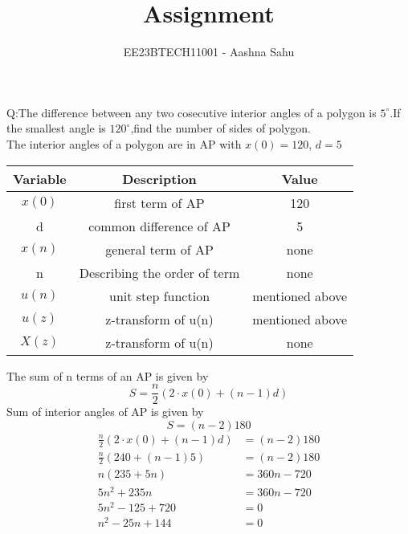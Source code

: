 \documentclass[journal,12pt,twocolumn]{IEEEtran}
\theoremstyle{remark}
\begin{document}
\let\vec\mathbf



\vspace{3cm}
\title{Assignment}
\author{EE23BTECH11001 - Aashna Sahu}
\maketitle
\newpage
\bigskip

\renewcommand{\thefigure}{\theenumi}
\renewcommand{\thetable}{\theenumi}
Q:The difference between any two cosecutive interior angles of a polygon is $5^\circ$.If the smallest angle is $120^\circ$,find the number of sides of polygon.
\\\solution
The interior angles of a polygon are in AP with
    $x(0)=120$, $d=5$
\begin{table}[ht]
  \centering
  \begin{tabular}{|c|c|c|}
    \hline
      \textbf{Variable}& \textbf{Description}& \textbf{Value}\\\hline
    $x(0)$& first term of AP& 120  \\\hline
    d& common difference of AP & 5\\\hline
    $x(n)$ & general  term of AP&none\\\hline
   n & Describing the order of term & none\\\hline
    $u(n)$& unit step function & mentioned above\\\hline
    $u(z) $& z-transform of u(n) & mentioned above\\\hline
    $X(z)$& z-transform of u(n) & none\\ 
    \hline
  \end{tabular}
  \end {table}
The sum of n terms of an AP is given by
\begin{equation}
    S=\frac{n}{2}(2\cdot x(0)+(n-1)d)
\end{equation}
Sum of interior angles of AP is given by
\begin{equation}
    S=(n-2)180
\end{equation}
\begin{align}
\frac{n}{2}(2\cdot x(0)+(n-1)d)&= (n-2)180\\
    \frac{n}{2}(240+(n-1)5)&=(n-2)180\\
    n(235+5n)&=360n-720\\
    5n^2+235n&=360n-720\\
    5n^2-125+720&=0\\
    n^2-25n+144&=0
\end{align}
\end{document}
